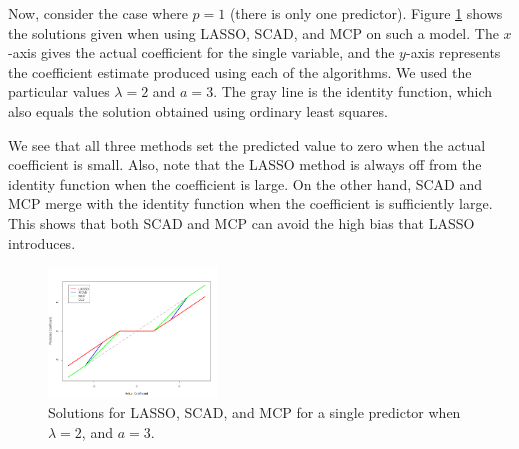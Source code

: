 \documentclass{article}
\begin{document}
Now, consider the case where $p=1$ (there is only one predictor). Figure \ref{fig:prediction} shows the solutions given when using LASSO, SCAD, and MCP on such a model. The $x$-axis gives the actual coefficient for the single variable, and the $y$-axis represents the coefficient estimate produced using each of the algorithms. We used the particular values $\lambda = 2$ and $a = 3$. The gray line is the identity function, which also equals the solution obtained using ordinary least squares.

We see that all three methods set the predicted value to zero when the actual coefficient is small. Also, note that the LASSO method is always off from the identity function when the coefficient is large. On the other hand, SCAD and MCP merge with the identity function when the coefficient is sufficiently large. This shows that both SCAD and MCP can avoid the high bias that LASSO introduces.

\begin{figure}[!h]
	\centering
	\caption{Solutions for LASSO, SCAD, and MCP for a single predictor when $\lambda=2$, and $a = 3$.}
	\label{fig:prediction}
	\includegraphics[width = 0.4\textwidth]{prediction.png}
\end{figure}

\newpage


\end{document}
